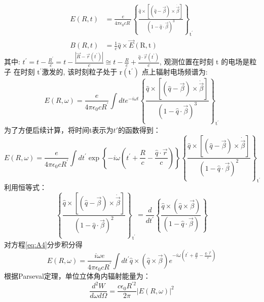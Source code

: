 \begin{align}
E({R}, t) & = \frac{e}{4 \pi \epsilon_{0} c R^{\prime}}\left\{\frac{\hat{q} \times[(\hat{q}-\vec{\beta}) \times \dot{\vec{\beta}}]}{(1-\hat{q} \cdot \vec{\beta})^{3}}\right\}_{\mathrm{t}^{\prime}} \\
B({R}, t) & = \frac{1}{c} \hat{q} \times \vec{E}(\mathrm{R}, \mathrm{t})
\end{align}
其中: $ t^{\prime}=t-\frac{R^{\prime}}{c}=t-\frac{\left|\vec{R}-\vec{r}\left(t^{\prime}\right)\right|}{{c}} \cong t-\frac{R}{c}+\frac{\hat{q} \cdot \vec{r}\left(t^{\prime}\right)}{c} $, 观测位置在时刻  $\mathrm{t} $ 的电场是粒子 在时刻 $ \mathrm{t}^{\prime}  $激发的, 该时刻粒子处于 $ \mathrm{r}\left(\mathrm{t}^{\prime}\right) $ 点上辐射电场频谱为:
\begin{equation}
E({R},\omega)=\frac{e}{4 \pi \epsilon_{0} c R^{\prime}} \int d t e^{-i \omega t}\left\{\frac{\hat{q} \times[(\hat{q}-\vec{\beta}) \times \dot{\vec{\beta}}]}{(1-\hat{q}\cdot \vec{\beta})^{3}}\right\}_{\mathrm{t}^{\prime}}
\end{equation}
为了方便后续计算，将时间t表示为$t'$的函数得到：
\begin{equation}\label{eq:A4}
E({R}, \omega)=\frac{e}{4 \pi \epsilon_{0} c R^{\prime}} \int d t^{\prime}\exp\left\{-i 
\omega\left(t^{\prime}+\frac{R}{c}-\frac{\hat{q} \cdot \vec{r}}{c}\right)\right\}\left\{\frac{\hat{q} 
\times[(\hat{q}-\vec{\beta}) \times \dot{\vec{\beta}}]}{(1-\hat{q} \cdot \vec{\beta})^{2}}\right\}
_{\mathrm{t}^{\prime}}
\end{equation}
利用恒等式：
\begin{equation}
\left\{\frac{\hat{q} \times[(\hat{q}-\vec{\beta}) \times \dot{\vec{\beta}}]}{(1-\hat{q}\cdot \vec{\beta})^{2}}\right\}_{\mathrm{t}^{\prime}}=\frac{d}{d t^{\prime}}\left\{\frac{\hat{q}\times(\hat{q} \times \vec{\beta})}{(1-\hat{q} \cdot \vec{\beta})}\right\}
\end{equation}
对方程\autoref{eq:A4}分步积分得
\begin{equation}\label{eq:intER}
{E}({R}, \omega)=\frac{i \omega e}{4 \pi \epsilon_{0} c R^{\prime}} \int d t^{\prime}\hat{q} \times(\hat{q} \times \vec{\beta}) e^{-i \omega\left(t^{\prime}+\frac{R}{c}-\frac{\hat{q}\cdot \vec{r}}{c}\right)}
\end{equation}
根据Parseval定理，单位立体角内辐射能量为：
\begin{equation}\label{eq:dWdw}
\frac{d^{2} W}{d \omega d \Omega}=\frac{c \epsilon_{0} R^{\prime 2}}{2 \pi}|{E}(R, \omega)|^{2}
\end{equation}
